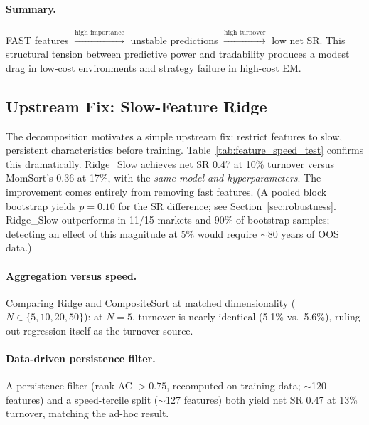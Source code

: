 \documentclass[sigconf,review,anonymous,balance=false]{acmart}
\begin{document}
\paragraph{Summary.}
FAST features $\xrightarrow{\text{high importance}}$
unstable predictions $\xrightarrow{\text{high turnover}}$
low net SR. This structural tension between predictive power and
tradability produces a modest drag in low-cost environments and
strategy failure in high-cost EM.


\subsection{Upstream Fix: Slow-Feature Ridge}
\label{sec:slowridge}

The decomposition motivates a simple upstream fix: restrict features
to slow, persistent characteristics before training.
Table~\ref{tab:feature_speed_test} confirms this dramatically.
Ridge\_Slow achieves net SR 0.47 at 10\% turnover versus MomSort's
0.36 at 17\%, with the \emph{same model and hyperparameters}. The
improvement comes entirely from removing fast features. (A pooled
block bootstrap yields $p = 0.10$ for the SR difference; see
Section~\ref{sec:robustness}. Ridge\_Slow outperforms in 11/15
markets and 90\% of bootstrap samples; detecting an effect of this
magnitude at 5\% would require ${\sim}$80 years of OOS data.)

\paragraph{Aggregation versus speed.}
Comparing Ridge and CompositeSort at matched dimensionality
($N \in \{5, 10, 20, 50\}$): at $N = 5$, turnover is nearly identical
(5.1\% vs.\ 5.6\%), ruling out regression itself as the turnover
source.

\paragraph{Data-driven persistence filter.}
A persistence filter (rank AC $> 0.75$, recomputed on training data;
${\sim}$120 features) and a speed-tercile split (${\sim}$127 features)
both yield net SR 0.47 at 13\% turnover, matching the ad-hoc result.
\end{document}
